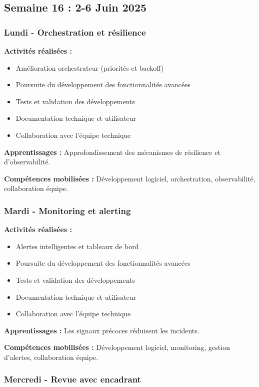 \subsection{Semaine 16 : 2-6 Juin 2025}

\subsubsection{Lundi - Orchestration et résilience}

\textbf{Activités réalisées :}
\begin{itemize}
    \item Amélioration orchestrateur (priorités et backoff)
    \item Poursuite du développement des fonctionnalités avancées
    \item Tests et validation des développements
    \item Documentation technique et utilisateur
    \item Collaboration avec l'équipe technique
\end{itemize}

\textbf{Apprentissages :}
Approfondissement des mécanismes de résilience et d'observabilité.

\textbf{Compétences mobilisées :}
Développement logiciel, orchestration, observabilité, collaboration équipe.

\subsubsection{Mardi - Monitoring et alerting}

\textbf{Activités réalisées :}
\begin{itemize}
    \item Alertes intelligentes et tableaux de bord
    \item Poursuite du développement des fonctionnalités avancées
    \item Tests et validation des développements
    \item Documentation technique et utilisateur
    \item Collaboration avec l'équipe technique
\end{itemize}

\textbf{Apprentissages :}
Les signaux précoces réduisent les incidents.

\textbf{Compétences mobilisées :}
Développement logiciel, monitoring, gestion d'alertes, collaboration équipe.

\subsubsection{Mercredi - Revue avec encadrant}

